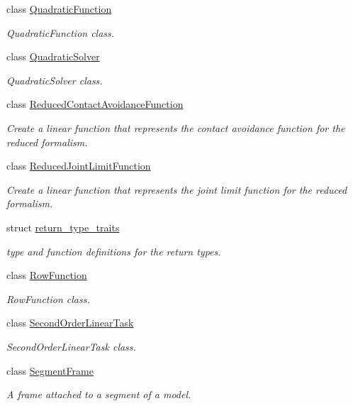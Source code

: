 \begin{DoxyCompactItemize}
class \hyperlink{classocra_1_1QuadraticFunction}{Quadratic\+Function}
\begin{DoxyCompactList}\small\item\em Quadratic\+Function class. \end{DoxyCompactList}\item 
class \hyperlink{classocra_1_1QuadraticSolver}{Quadratic\+Solver}
\begin{DoxyCompactList}\small\item\em Quadratic\+Solver class. \end{DoxyCompactList}\item 
class \hyperlink{classocra_1_1ReducedContactAvoidanceFunction}{Reduced\+Contact\+Avoidance\+Function}
\begin{DoxyCompactList}\small\item\em Create a linear function that represents the contact avoidance function for the reduced formalism. \end{DoxyCompactList}\item 
class \hyperlink{classocra_1_1ReducedJointLimitFunction}{Reduced\+Joint\+Limit\+Function}
\begin{DoxyCompactList}\small\item\em Create a linear function that represents the joint limit function for the reduced formalism. \end{DoxyCompactList}\item 
struct \hyperlink{structocra_1_1return__type__traits}{return\+\_\+type\+\_\+traits}
\begin{DoxyCompactList}\small\item\em type and function definitions for the return types. \end{DoxyCompactList}\item 
class \hyperlink{classocra_1_1RowFunction}{Row\+Function}
\begin{DoxyCompactList}\small\item\em Row\+Function class. \end{DoxyCompactList}\item 
class \hyperlink{classocra_1_1SecondOrderLinearTask}{Second\+Order\+Linear\+Task}
\begin{DoxyCompactList}\small\item\em Second\+Order\+Linear\+Task class. \end{DoxyCompactList}\item 
class \hyperlink{classocra_1_1SegmentFrame}{Segment\+Frame}
\begin{DoxyCompactList}\small\item\em A frame attached to a segment of a model. \end{DoxyCompactList}\item 

\end{DoxyCompactItemize}
